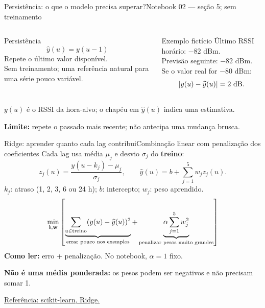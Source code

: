 \begin{frame}{Persistência: o que o modelo precisa superar?}{Notebook 02 — seção 5; sem treinamento}
\begin{columns}[T]
\begin{block}{Persistência}
\[
\widehat y(u)=y(u-1)
\]
Repete o último valor disponível.\\[2mm]
Sem treinamento; uma referência natural para uma série pouco variável.
\end{block}
\begin{block}{Exemplo fictício}
Último RSSI horário: $-82$ dBm.\\
Previsão seguinte: $-82$ dBm.\\[2mm]
Se o valor real for $-80$ dBm:
\[
|y(u)-\widehat y(u)|=2\ {\rm dB}.
\]
\end{block}
\end{columns}
\vspace{3mm}
$y(u)$ é o RSSI da hora-alvo; o chapéu em $\widehat y(u)$ indica uma estimativa.
\par\vspace{2mm}
\textbf{Limite:} repete o passado mais recente; não antecipa uma mudança brusca.
\end{frame}

\begin{frame}{Ridge: aprender quanto cada lag contribui}{Combinação linear com penalização dos coeficientes}
\small
\setlength{\abovedisplayskip}{4pt}\setlength{\belowdisplayskip}{4pt}
\setlength{\abovedisplayshortskip}{0pt}\setlength{\belowdisplayshortskip}{0pt}
Cada lag usa média $\mu_j$ e desvio $\sigma_j$ do \textbf{treino}:
\[
z_j(u)=\frac{y(u-k_j)-\mu_j}{\sigma_j},
\qquad
\widehat y(u)=b+\sum_{j=1}^{5}w_jz_j(u).
\]
$k_j$: atraso (1, 2, 3, 6 ou 24 h); $b$: intercepto; $w_j$: peso aprendido.
\[
\min_{b,\mathbf w}\left[
\underbrace{\sum_{u\in{\rm treino}}(y(u)-\widehat y(u))^2}_{\text{errar pouco nos exemplos}}
+
\underbrace{\alpha\sum_{j=1}^{5}w_j^2}_{\text{penalizar pesos muito grandes}}
\right]
\]
\textbf{Como ler:} erro + penalização. No notebook, $\alpha=1$ fixo.
\par\vspace{2mm}
\textbf{Não é uma média ponderada:} os pesos podem ser negativos e não precisam somar 1.
\par\scriptsize \href{https://scikit-learn.org/stable/modules/generated/sklearn.linear_model.Ridge.html}{Referência: scikit-learn, Ridge.}
\end{frame}


